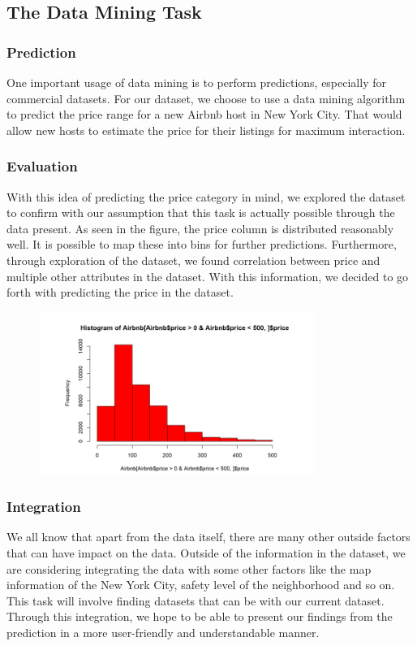 \documentclass{sig-alternate}
\begin{document}
	\subsection{The Data Mining Task}
	\subsubsection{Prediction}
	One important usage of data mining is to perform predictions, especially for commercial
	datasets. For our dataset, we choose to use a data mining algorithm to predict the price range for a new Airbnb host in New York City. That would allow new hosts to estimate the price for their listings for maximum interaction. 
	\subsubsection{Evaluation}
	With this idea of predicting the price category in mind, we explored the dataset to confirm with our assumption that this task is actually possible through the data present. As seen in the figure, the price column is distributed reasonably well. It is possible to map these into bins for further predictions. Furthermore, through exploration of the dataset, we found correlation between price and multiple other attributes in the dataset. With this information, we decided to go forth with predicting the price in the dataset. 
	\begin{figure}[ht]
		\includegraphics[width=9cm]{hist.png}
		\label{hist}
		\centering
	\end{figure} 

	\subsubsection{Integration}
	We all know that apart from the data itself, there are many other outside factors that can 
	have impact on the data. Outside of the information in the dataset, we are considering integrating the data with some other factors like the map information of the New York City, safety level of the neighborhood and so on.
	This task will involve finding datasets that can be with our current dataset. Through this integration, we hope to be able to present our findings from the prediction in a more user-friendly and understandable manner. 
	
\end{document}
